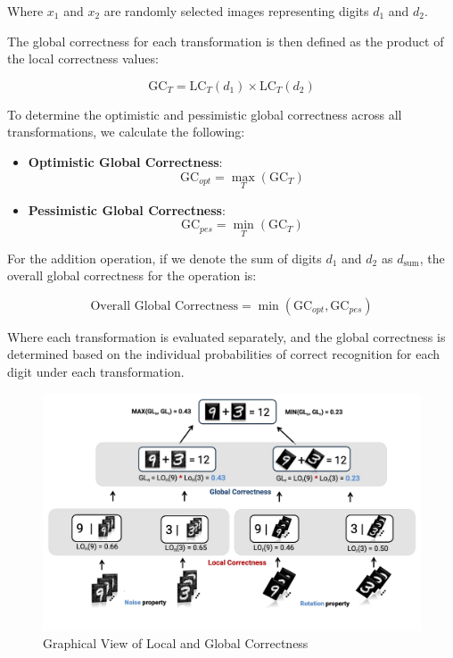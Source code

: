 \documentclass[10pt, conference, a4paper, final]{IEEEtran}
\begin{document}
    Where \( x_1 \) and \( x_2 \) are randomly selected images representing digits \( d_1 \) and \( d_2 \).
    
    The global correctness for each transformation is then defined as the product of the local correctness values:
    
    \[
    \text{GC}_{T} = \text{LC}_{T}(d_1) \times \text{LC}_{T}(d_2)
    \]
    
    To determine the optimistic and pessimistic global correctness across all transformations, we calculate the following:
    
    \begin{itemize}
        \item \textbf{Optimistic Global Correctness}:
        \[
        \text{GC}_{opt} = \max_{T} (\text{GC}_{T})
        \]
        \item \textbf{Pessimistic Global Correctness}:
        \[
        \text{GC}_{pes} = \min_{T} (\text{GC}_{T})
        \]
    \end{itemize}
    
    For the addition operation, if we denote the sum of digits \( d_1 \) and \( d_2 \) as \( d_{\text{sum}} \), the overall global correctness for the operation is:
    
    \[
    \text{Overall Global Correctness} = \min(\text{GC}_{opt}, \text{GC}_{pes})
    \]
    
    Where each transformation is evaluated separately, and the global correctness is determined based on the individual probabilities of correct recognition for each digit under each transformation.
    \begin{figure}{}
        \centering
        \includegraphics[width=\linewidth]{paper_images/noise_rotation_localcal_global.pdf}
        \caption{Graphical View of Local and Global Correctness}
        \label{fig:graph}
    \end{figure}
\end{document}
